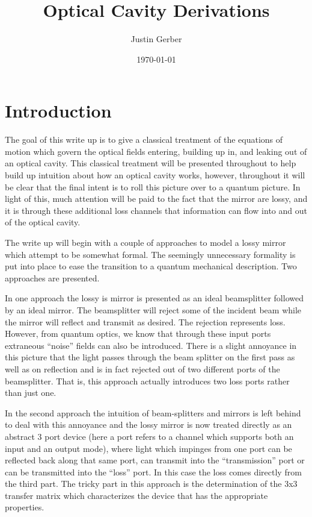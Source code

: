 \documentclass[12pt]{article}
\begin{document}
\title{Optical Cavity Derivations}
\author{Justin Gerber}
\date{\today}
\maketitle

\section{Introduction}

The goal of this write up is to give a classical treatment of the equations of motion which govern the optical fields entering, building up in, and leaking out of an optical cavity. This classical treatment will be presented throughout to help build up intuition about how an optical cavity works, however, throughout it will be clear that the final intent is to roll this picture over to a quantum picture. In light of this, much attention will be paid to the fact that the mirror are lossy, and it is through these additional loss channels that information can flow into and out of the optical cavity.

The write up will begin with a couple of approaches to model a lossy mirror which attempt to be somewhat formal. The seemingly unnecessary formality is put into place to ease the transition to a quantum mechanical description. Two approaches are presented. 

In one approach the lossy is mirror is presented as an ideal beamsplitter followed by an ideal mirror. The beamsplitter will reject some of the incident beam while the mirror will reflect and transmit as desired. The rejection represents loss. However, from quantum optics, we know that through these input ports extraneous ``noise'' fields can also be introduced. There is a slight annoyance in this picture that the light passes through the beam splitter on the first pass as well as on reflection and is in fact rejected out of two different ports of the beamsplitter. That is, this approach actually introduces two loss ports rather than just one.

In the second approach the intuition of beam-splitters and mirrors is left behind to deal with this annoyance and the lossy mirror is now treated directly as an abstract 3 port device (here a port refers to a channel which supports both an input and an output mode), where light which impinges from one port can be reflected back along that same port, can transmit into the ``transmission'' port or can be transmitted into the ``loss'' port. In this case the loss comes directly from the third part. The tricky part in this approach is the determination of the 3x3 transfer matrix which characterizes the device that has the appropriate properties.
\end{document}
